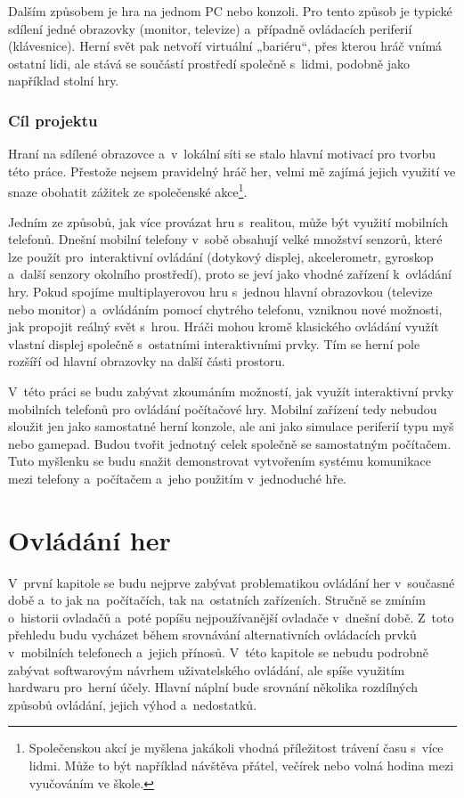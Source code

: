 \documentclass[thesis=B,czech,hidelinks]{FITthesis}[2012/06/26] %
\begin{document}
\begin{introduction}
Dalším způsobem je hra na jednom PC nebo konzoli. Pro tento způsob je typické sdílení jedné obrazovky (monitor, televize) a~případně ovládacích periferií (klávesnice). Herní svět pak netvoří virtuální „bariéru“, přes kterou hráč vnímá ostatní lidi, ale stává se součástí prostředí společně s~lidmi, podobně jako například stolní hry.

\subsection{Cíl projektu}

Hraní na sdílené obrazovce a~v~lokální síti se stalo hlavní motivací pro tvorbu této práce. Přestože nejsem pravidelný hráč her, velmi mě zajímá jejich využití ve snaze obohatit zážitek ze společenské akce\footnote{Společenskou akcí je myšlena jakákoli vhodná příležitost trávení času s~více lidmi. Může to být například návštěva přátel, večírek nebo volná hodina mezi vyučováním ve škole.}. 

Jedním ze způsobů, jak více provázat hru s~realitou, může být využití mobilních telefonů. Dnešní mobilní telefony v~sobě obsahují velké množství senzorů, které lze použít pro~interaktivní ovládání (dotykový displej, akcelerometr, gyroskop a~další senzory okolního prostředí), proto se jeví jako vhodné zařízení k~ovládání hry. Pokud spojíme multiplayerovou hru s~jednou hlavní obrazovkou (televize nebo monitor) a~ovládáním pomocí chytrého telefonu, vzniknou nové možnosti, jak propojit reálný svět s~hrou. Hráči mohou kromě klasického ovládání využít vlastní displej společně s~ostatními interaktivními prvky. Tím se herní pole rozšíří od hlavní obrazovky na další části prostoru.

V~této práci se budu zabývat zkoumáním možností, jak využít interaktivní prvky mobilních telefonů pro ovládání počítačové hry. Mobilní zařízení tedy nebudou sloužit jen jako samostatné herní konzole, ale ani jako simulace periferií typu myš nebo gamepad. Budou tvořit jednotný celek společně se samostatným počítačem. Tuto myšlenku se budu snažit demonstrovat vytvořením systému komunikace mezi telefony a~počítačem a~jeho použitím v~jednoduché hře.

\end{introduction}

\chapter{Ovládání her}

V~první kapitole se budu nejprve zabývat problematikou ovládání her v~současné době a~to jak na~počítačích, tak na~ostatních zařízeních. Stručně se zmíním o~historii ovladačů a~poté popíšu nejpoužívanější ovladače v~dnešní době. Z~toto přehledu budu vycházet během srovnávání alternativních ovládacích prvků v~mobilních telefonech a~jejich přínosů. V~této kapitole se nebudu podrobně zabývat softwarovým návrhem uživatelského ovládání, ale spíše využitím hardwaru pro~herní účely. Hlavní náplní bude srovnání několika rozdílných způsobů ovládání, jejich výhod a~nedostatků.
\end{document}
